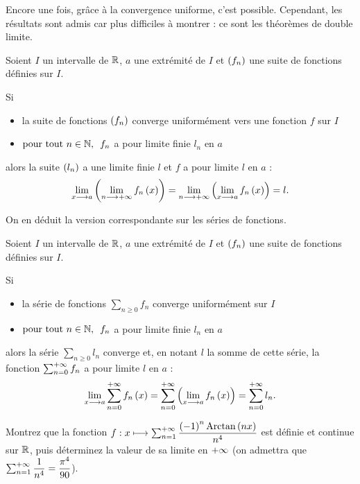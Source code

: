 Encore une fois, grâce à la convergence uniforme, c'est possible. Cependant, les résultats sont admis car plus difficiles à montrer : ce sont les théorèmes de double limite.

\begin{theo}
Soient \(I\) un intervalle de \(\mathbb{R}\), \(a\) une extrémité de \(I\) et \(\left(f_n\right)\) une suite de fonctions définies sur \(I\).

Si

\begin{itemize}
    \item la suite de fonctions \(\left(f_n\right)\) converge uniformément vers une fonction \(f\) sur \(I\) \\
    \item \(\quantifs{\tpt n\in\N}f_n\) a pour limite finie \(l_n\) en \(a\)
\end{itemize}

alors la suite \(\left(l_n\right)\) a une limite finie \(l\) et \(f\) a pour limite \(l\) en \(a\) : \[\lim_{x\longrightarrow a}\left(\lim_{n\longrightarrow+\infty}f_n\left(x\right)\right)=\lim_{n\longrightarrow+\infty}\left(\lim_{x\longrightarrow a}f_n\left(x\right)\right)=l.\]
\end{theo}

On en déduit la version correspondante sur les séries de fonctions.

\begin{cor}
Soient \(I\) un intervalle de \(\mathbb{R}\), \(a\) une extrémité de \(I\) et \(\left(f_n\right)\) une suite de fonctions définies sur \(I\).

Si

\begin{itemize}
    \item la série de fonctions \(\sum_{n\geq0}f_n\) converge uniformément sur \(I\) \\
    \item \(\quantifs{\tpt n\in\N}f_n\) a pour limite finie \(l_n\) en \(a\)
\end{itemize}

alors la série \(\sum_{n\geq0}l_n\) converge et, en notant \(l\) la somme de cette série, la fonction \(\sum_{n=0}^{+\infty}f_n\) a pour limite \(l\) en \(a\) : \[\lim_{x\longrightarrow a}\sum_{n=0}^{+\infty}f_n\left(x\right)=\sum_{n=0}^{+\infty}\left(\lim_{x\longrightarrow a}f_n\left(x\right)\right)=\sum_{n=0}^{+\infty}l_n.\]
\end{cor}

\begin{exo}
Montrez que la fonction \(f:x\longmapsto\sum_{n=1}^{+\infty}\dfrac{\left(-1\right)^n\operatorname{Arctan}\left(nx\right)}{n^4}\) est définie et continue sur \(\mathbb{R}\), puis déterminez la valeur de sa limite en \(+\infty\) (on admettra que \(\sum_{n=1}^{+\infty}\dfrac{1}{n^4}=\dfrac{\pi^4}{90}\)).
\end{exo}


